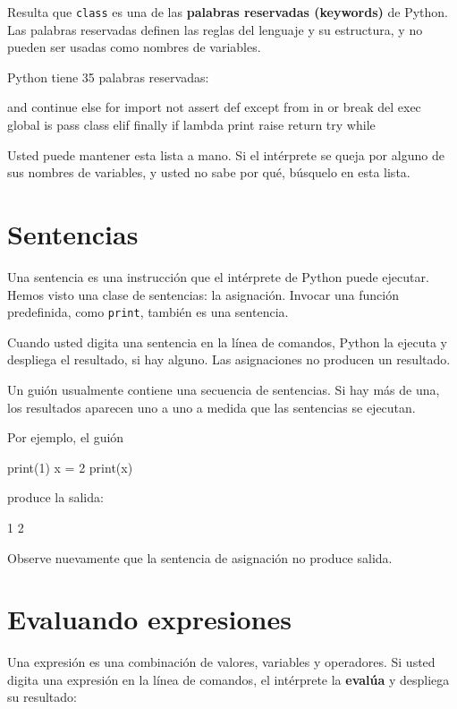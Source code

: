 Resulta que \texttt{class} es una de las \textbf{palabras reservadas
(keywords)} de Python. Las palabras reservadas definen las reglas
del lenguaje y su estructura, y no pueden ser usadas como nombres
de variables.


Python tiene 35 palabras reservadas:

\begin{pyconcode}
and       continue  else      for       import    not       
assert    def       except    from      in        or        
break     del       exec      global    is        pass      
class     elif      finally   if        lambda    print     
raise     return    try       while
\end{pyconcode}


Usted puede mantener esta lista a mano. Si el intérprete se queja
por alguno de sus nombres de variables, y usted no sabe por qué, búsquelo
en esta lista.

\section{Sentencias}

Una sentencia es una instrucción que el intérprete de Python puede
ejecutar. Hemos visto una clase de sentencias: la asignación. Invocar
una función predefinida, como \texttt{print}, también es una sentencia.

Cuando usted digita una sentencia en la línea de comandos, Python
la ejecuta y despliega el resultado, si hay alguno. Las asignaciones
no producen un resultado.

Un guión usualmente contiene una secuencia de sentencias. Si hay más
de una, los resultados aparecen uno a uno a medida que las sentencias
se ejecutan.

Por ejemplo, el guión

\begin{pythoncode}
print(1)
x = 2
print(x)
\end{pythoncode}
produce la salida:
\begin{pythoncode}
1
2
\end{pythoncode}
Observe nuevamente que la sentencia de asignación no produce salida.

\section{Evaluando expresiones}

Una expresión es una combinación de valores, variables y operadores.
Si usted digita una expresión en la línea de comandos, el intérprete
la \textbf{evalúa} y despliega su resultado:

